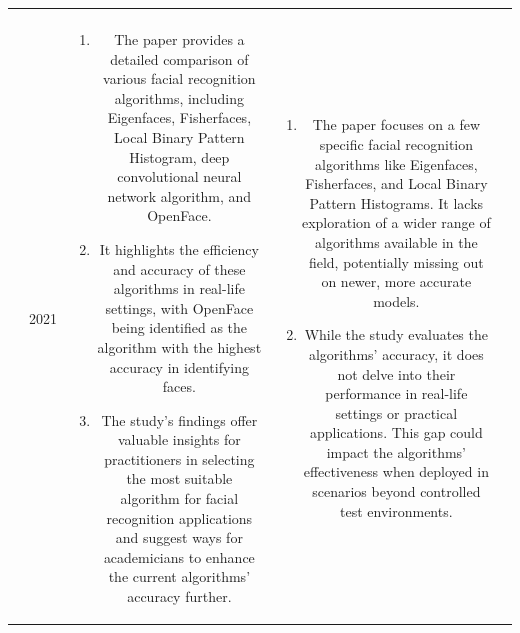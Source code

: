 \documentclass[conference]{IEEEtran}
\begin{document}
\begin{table}[]
\begin{tabular}{|c|c|c|c|c|}
\begin{minipage}[t]{0.2\textwidth}
            Author:  \textit{Coe, James, and Mustafa Atay.}
            \\

        \end{minipage}
                                           & 2021                                                                              &
        \begin{minipage}[t]{0.3\textwidth}
            \begin{enumerate}
                \item The paper provides a detailed comparison of various facial recognition algorithms, including Eigenfaces, Fisherfaces, Local Binary Pattern Histogram, deep convolutional neural network algorithm, and OpenFace.
                \item It highlights the efficiency and accuracy of these algorithms in real-life settings, with OpenFace being identified as the algorithm with the highest accuracy in identifying faces.
                \item The study's findings offer valuable insights for practitioners in selecting the most suitable algorithm for facial recognition applications and suggest ways for academicians to enhance the current algorithms' accuracy further.
            \end{enumerate}
        \end{minipage} &
        \begin{minipage}[t]{0.3\textwidth}
            \begin{enumerate}
                \item The paper focuses on a few specific facial recognition algorithms like Eigenfaces, Fisherfaces, and Local Binary Pattern Histograms. It lacks exploration of a wider range of algorithms available in the field, potentially missing out on newer, more accurate models.

                \item While the study evaluates the algorithms' accuracy, it does not delve into their performance in real-life settings or practical applications. This gap could impact the algorithms' effectiveness when deployed in scenarios beyond controlled test environments.


\end{enumerate}
\end{minipage}
\end{tabular}
\end{table}
\end{document}
